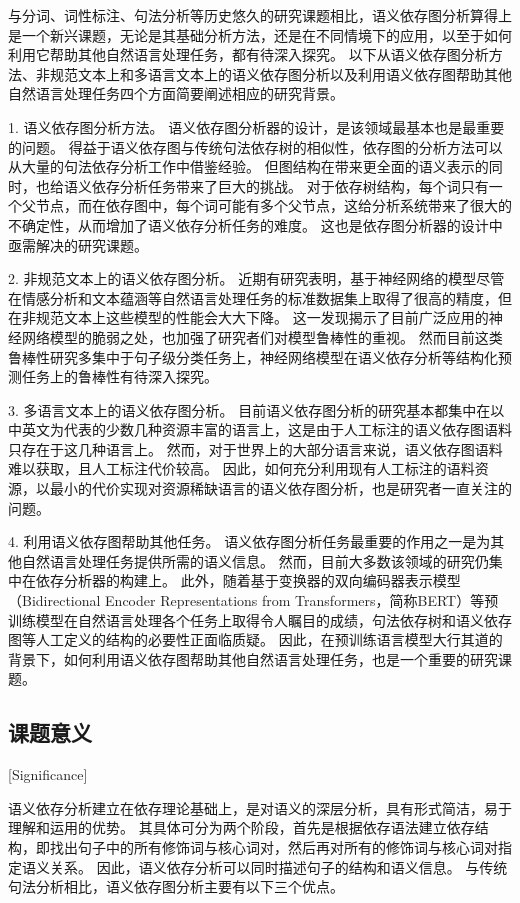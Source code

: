 与分词、词性标注、句法分析等历史悠久的研究课题相比，语义依存图分析算得上是一个新兴课题，无论是其基础分析方法，还是在不同情境下的应用，以至于如何利用它帮助其他自然语言处理任务，都有待深入探究。
以下从语义依存图分析方法、非规范文本上和多语言文本上的语义依存图分析以及利用语义依存图帮助其他自然语言处理任务四个方面简要阐述相应的研究背景。

1. 语义依存图分析方法。
语义依存图分析器的设计，是该领域最基本也是最重要的问题。
得益于语义依存图与传统句法依存树的相似性，依存图的分析方法可以从大量的句法依存分析工作中借鉴经验。
但图结构在带来更全面的语义表示的同时，也给语义依存分析任务带来了巨大的挑战。
对于依存树结构，每个词只有一个父节点，而在依存图中，每个词可能有多个父节点，这给分析系统带来了很大的不确定性，从而增加了语义依存分析任务的难度。
这也是依存图分析器的设计中亟需解决的研究课题。

2. 非规范文本上的语义依存图分析。
近期有研究表明，基于神经网络的模型尽管在情感分析\cite{zhang-etal-2019-generating}和文本蕴涵\cite{jin-etal-2020-isbert}等自然语言处理任务的标准数据集上取得了很高的精度，但在非规范文本上这些模型的性能会大大下降。
这一发现揭示了目前广泛应用的神经网络模型的脆弱之处，也加强了研究者们对模型鲁棒性的重视。
然而目前这类鲁棒性研究多集中于句子级分类任务上，神经网络模型在语义依存分析等结构化预测任务上的鲁棒性有待深入探究。

3. 多语言文本上的语义依存图分析。
目前语义依存图分析的研究基本都集中在以中英文为代表的少数几种资源丰富的语言上，这是由于人工标注的语义依存图语料只存在于这几种语言上。
然而，对于世界上的大部分语言来说，语义依存图语料难以获取，且人工标注代价较高。
因此，如何充分利用现有人工标注的语料资源，以最小的代价实现对资源稀缺语言的语义依存图分析，也是研究者一直关注的问题。

4. 利用语义依存图帮助其他任务。
语义依存图分析任务最重要的作用之一是为其他自然语言处理任务提供所需的语义信息。
然而，目前大多数该领域的研究仍集中在依存分析器的构建上。
此外，随着基于变换器的双向编码器表示模型（Bidirectional Encoder Representations from Transformers，简称BERT）\cite{devlin-etal-2018-bert}等预训练模型在自然语言处理各个任务上取得令人瞩目的成绩，句法依存树和语义依存图等人工定义的结构的必要性正面临质疑。
因此，在预训练语言模型大行其道的背景下，如何利用语义依存图帮助其他自然语言处理任务，也是一个重要的研究课题。


\subsection{课题意义}[Significance]

语义依存分析建立在依存理论基础上，是对语义的深层分析，具有形式简洁，易于理解和运用的优势。
其具体可分为两个阶段，首先是根据依存语法建立依存结构，即找出句子中的所有修饰词与核心词对，然后再对所有的修饰词与核心词对指定语义关系。
因此，语义依存分析可以同时描述句子的结构和语义信息。
与传统句法分析相比，语义依存图分析主要有以下三个优点。



